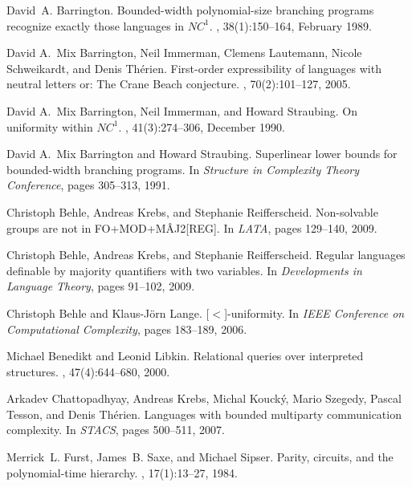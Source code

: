 \documentclass[envcountsame]{llncs}
\begin{document}
\begin{thebibliography}{10}

David~A. Barrington.
\newblock Bounded-width polynomial-size branching programs recognize exactly
  those languages in {$NC^1$}.
, 38(1):150--164,
  February 1989.

David A.~Mix Barrington, Neil Immerman, Clemens Lautemann, Nicole Schweikardt,
  and Denis Th{\'e}rien.
\newblock First-order expressibility of languages with neutral letters or: The
  {C}rane {B}each conjecture.
, 70(2):101--127, 2005.

David A.~Mix Barrington, Neil Immerman, and Howard Straubing.
\newblock On uniformity within {$NC^1$}.
, 41(3):274--306,
  December 1990.

David A.~Mix Barrington and Howard Straubing.
\newblock Superlinear lower bounds for bounded-width branching programs.
\newblock In {\em Structure in Complexity Theory Conference}, pages 305--313,
  1991.

Christoph Behle, Andreas Krebs, and Stephanie Reifferscheid.
\newblock Non-solvable groups are not in {FO+MOD+M{\^A}J2[REG]}.
\newblock In {\em LATA}, pages 129--140, 2009.

Christoph Behle, Andreas Krebs, and Stephanie Reifferscheid.
\newblock Regular languages definable by majority quantifiers with two
  variables.
\newblock In {\em Developments in Language Theory}, pages 91--102, 2009.

Christoph Behle and Klaus-J{\"o}rn Lange.
[$<$]-uniformity.
\newblock In {\em IEEE Conference on Computational Complexity}, pages 183--189,
  2006.

Michael Benedikt and Leonid Libkin.
\newblock Relational queries over interpreted structures.
, 47(4):644--680, 2000.

Arkadev Chattopadhyay, Andreas Krebs, Michal Kouck{\'y}, Mario Szegedy, Pascal
  Tesson, and Denis Th{\'e}rien.
\newblock Languages with bounded multiparty communication complexity.
\newblock In {\em STACS}, pages 500--511, 2007.

Merrick~L. Furst, James~B. Saxe, and Michael Sipser.
\newblock Parity, circuits, and the polynomial-time hierarchy.
, 17(1):13--27, 1984.


\end{thebibliography}
\end{document}
